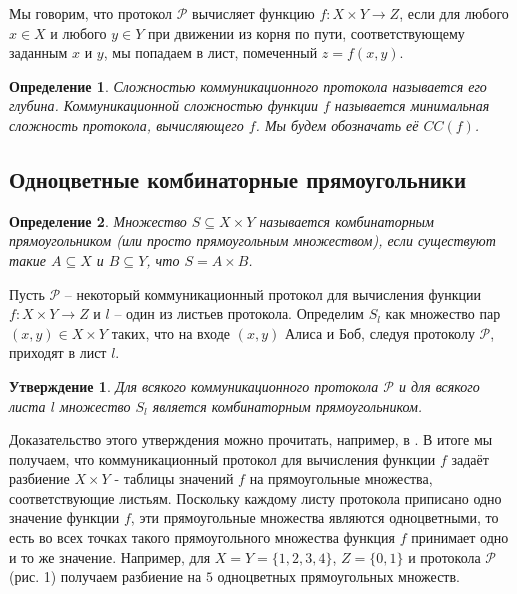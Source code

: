 \documentclass[a4paper]{article}
\newtheorem*{mdefinition}{Определение}
\newtheorem{mclaim}{Утверждение}[section]
\begin{document}
Мы говорим, что протокол $\mathcal{P}$ вычисляет функцию $f:X\times Y \rightarrow Z$, если для любого
$x\in X$ и любого $y\in Y$ при движении из корня по пути, соответствующему заданным $x$ и $y$,
мы попадаем в лист, помеченный $z=f(x,y)$.

\begin{mdefinition}
	Сложностью коммуникационного протокола называется его глубина. Коммуникационной сложностью функции 
	$f$ называется минимальная сложность протокола, вычисляющего $f$. Мы будем обозначать её $CC(f)$.
\end{mdefinition}


\subsection{Одноцветные комбинаторные прямоугольники}
\begin{mdefinition}
	Множество $S \subseteq X\times Y$ называется комбинаторным прямоугольником (или просто прямоугольным
	множеством), если существуют такие $A \subseteq X$ и $B \subseteq Y$, что $S = A\times B$.
\end{mdefinition}

Пусть $\mathcal{P}$ -- некоторый коммуникационный протокол для вычисления функции $f:X\times Y \rightarrow Z$ 
и $l$ -- один из листьев протокола. Определим $S_l$ как множество пар $(x, y) \in X\times Y$ таких, что 
на входе $(x,y)$ Алиса и Боб, следуя протоколу $\mathcal{P}$, приходят в лист $l$.

\begin{mclaim}
    Для всякого коммуникационного протокола $\mathcal{P}$ и для всякого листа $l$ множество $S_l$
    является комбинаторным прямоугольником. 
\end{mclaim}

Доказательство этого утверждения можно прочитать, например, в \cite{KushilevitzNisan}. В итоге мы получаем,
что коммуникационный протокол для вычисления функции $f$ задаёт разбиение $X\times Y$ - 
таблицы значений $f$ на прямоугольные множества, соответствующие листьям. Поскольку каждому
листу протокола приписано одно значение функции $f$, эти прямоугольные множества являются одноцветными,
то есть во всех точках такого прямоугольного множества функция $f$ принимает одно и то же значение.
Например, для $X = Y = \{1, 2, 3, 4\}$, $Z = \{0, 1\}$ и протокола $\mathcal{P}$ (рис. 1) получаем 
разбиение на $5$ одноцветных прямоугольных множеств. 
\end{document}
